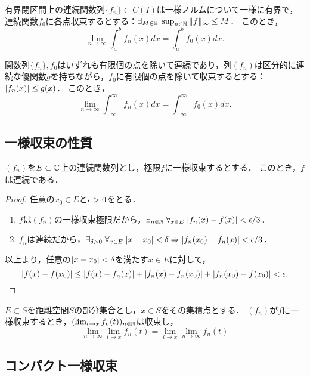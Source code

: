 \documentclass[uplatex, dvipdfmx]{jsreport}
\begin{document}
\begin{theorem}[Arzelàの有界収束定理 (1885)]
    有界閉区間上の連続関数列$\{f_n\}\subset C(I)$は一様ノルムについて一様に有界で，連続関数$f_0$に各点収束するとする：$\exists_{M\in\mathbb{R}}\;\sup_{n\in\mathbb{N}}\|f\|_\infty\le M$．
    このとき，
    \[\lim_{n\to\infty}\int^b_af_n(x)dx=\int^b_af_0(x)dx.\]
\end{theorem}

\begin{corollary}
    関数列$\{f_n\},f_0$はいずれも有限個の点を除いて連続であり，列$(f_n)$は区分的に連続な優関数$g$を持ちながら，$f_0$に有限個の点を除いて収束するとする：$\lvert f_n(x)\rvert\le g(x)$．
    このとき，
    \[\lim_{n\to\infty}\int^\infty_{-\infty}f_n(x)dx=\int^\infty_{-\infty}f_0(x)dx.\]
\end{corollary}

\subsection{一様収束の性質}

\begin{theorem}[一様収束は連続性を保つ]
    $(f_n)$を$E\subset\mathbb{C}$上の連続関数列とし，極限$f$に一様収束するとする．
    このとき，$f$は連続である．
\end{theorem}
\begin{proof}
    任意の$x_0\in E$と$\epsilon>0$をとる．
    \begin{enumerate}
        \item $f$は$(f_n)$の一様収束極限だから，$\exists_{n\in\mathbb{N}}\;\forall_{x\in E}\;\lvert f_n(x)-f(x)\rvert<\epsilon/3$．
        \item $f_n$は連続だから，$\exists_{\delta>0}\;\forall_{x\in E}\;\lvert x-x_0\rvert<\delta\Rightarrow\lvert f_n(x_0)-f_n(x)\rvert<\epsilon/3$．
    \end{enumerate}
    以上より，任意の$\lvert x-x_0\rvert<\delta$を満たす$x\in E$に対して，
    \[\lvert f(x)-f(x_0)\rvert\le\lvert f(x)-f_n(x)\rvert+\lvert f_n(x)-f_n(x_0)\rvert+\lvert f_n(x_0)-f(x_0)\rvert<\epsilon.\]
\end{proof}

\begin{theorem}
    $E\subset S$を距離空間$S$の部分集合とし，$x\in S$をその集積点とする．
    $(f_n)$が$f$に一様収束するとき，$(\lim_{t\to x}f_n(t))_{n\in\mathbb{N}}$は収束し，
    \[\lim_{n\to\infty}\lim_{t\to x}f_n(t)=\lim_{t\to x}\lim_{n\to\infty}f_n(t)\]
\end{theorem}

\subsection{コンパクト一様収束}
\end{document}
